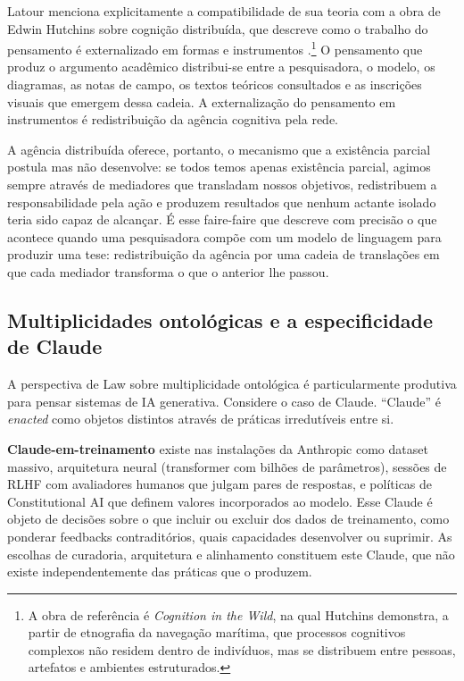Latour menciona explicitamente a compatibilidade de sua teoria com a obra de Edwin Hutchins sobre cognição distribuída, que descreve como o trabalho do pensamento é externalizado em formas e instrumentos \parencite{latour2010factish}.\footnote{A obra de referência é \textit{Cognition in the Wild}, na qual Hutchins demonstra, a partir de etnografia da navegação marítima, que processos cognitivos complexos não residem dentro de indivíduos, mas se distribuem entre pessoas, artefatos e ambientes estruturados.} O pensamento que produz o argumento acadêmico distribui-se entre a pesquisadora, o modelo, os diagramas, as notas de campo, os textos teóricos consultados e as inscrições visuais que emergem dessa cadeia. A externalização do pensamento em instrumentos é redistribuição da agência cognitiva pela rede.

A agência distribuída oferece, portanto, o mecanismo que a existência parcial postula mas não desenvolve: se todos temos apenas existência parcial, agimos sempre através de mediadores que transladam nossos objetivos, redistribuem a responsabilidade pela ação e produzem resultados que nenhum actante isolado teria sido capaz de alcançar. É esse faire-faire que descreve com precisão o que acontece quando uma pesquisadora compõe com um modelo de linguagem para produzir uma tese: redistribuição da agência por uma cadeia de translações em que cada mediador transforma o que o anterior lhe passou.

\subsection*{Multiplicidades ontológicas e a especificidade de Claude}

A perspectiva de Law sobre multiplicidade ontológica é particularmente produtiva para pensar sistemas de IA generativa. Considere o caso de Claude. ``Claude'' é \textit{enacted} como objetos distintos através de práticas irredutíveis entre si.

\textbf{Claude-em-treinamento} existe nas instalações da Anthropic como dataset massivo, arquitetura neural (transformer com bilhões de parâmetros), sessões de RLHF com avaliadores humanos que julgam pares de respostas, e políticas de Constitutional AI que definem valores incorporados ao modelo. Esse Claude é objeto de decisões sobre o que incluir ou excluir dos dados de treinamento, como ponderar feedbacks contraditórios, quais capacidades desenvolver ou suprimir. As escolhas de curadoria, arquitetura e alinhamento constituem este Claude, que não existe independentemente das práticas que o produzem.

